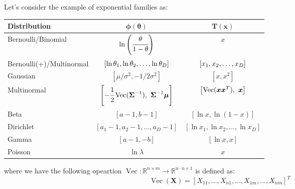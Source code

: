 \begin{remark}
    Let's consider the example of exponential families as:
    \begin{table}[H]
    \centering
    \begin{tabular}{lcc}
        \toprule
        \textbf{Distribution}   & $\boldsymbol \phi(\boldsymbol \theta)$  & $\boldsymbol T(\boldsymbol x)$ \\
        \midrule
        Bernoulli/Binomial & $\ln \left( \cfrac{\theta}{1-\theta} \right)$ & $x$ \\
        \addlinespace[0.25em]
        Bernoulli(+)/Multinormal & $\left[ \ln \theta_1, \ln \theta_2, \dots, \ln\theta_D \right]$ & $\left[ x_1, x_2, \dots, x_D \right]$ \\
        \addlinespace[0.25em]
        Gaussian & $[\mu/\sigma^2, -1/2\sigma^2]$ & $[x, x^2]$ \\
        \addlinespace[0.25em]
        Multinormal & $\left[ -\cfrac{1}{2}\operatorname{Vec}(\boldsymbol \Sigma^{-1}), \ \boldsymbol \Sigma^{-1}\boldsymbol \mu \right]$ & $\left[ \operatorname{Vec}(\boldsymbol x\boldsymbol x^T), \ \boldsymbol x \right]$\\ 
        \addlinespace[0.25em]
        Beta & $[a-1, b-1]$ & $[\ln x, \ln (1-x)]$ \\
        \addlinespace[0.25em]
        Dirichlet & $[a_1-1, a_2-1, \dots, a_D-1]$ & $[\ln x_1, \ln x_2, \dots, \ln x_D]$ \\
        \addlinespace[0.25em]
        Gamma & $[a-1, -b]$ & $[\ln x, x]$ \\
        \addlinespace[0.25em]
        Poisson & $\ln\lambda$ & $x$ \\
        \bottomrule
    \end{tabular}
    \end{table}    
    where we have the following opeartion $\operatorname{Vec} : \mathbb{R}^{n\times m}\rightarrow \mathbb{R}^{n\cdot n \times 1}$ is defined as:
    \begin{equation*}
        \operatorname{Vec}(\boldsymbol X) = [X_{11},\dots,X_{n1},\dots,X_{1m},\dots,X_{nm}]^T
    \end{equation*}
\end{remark}

